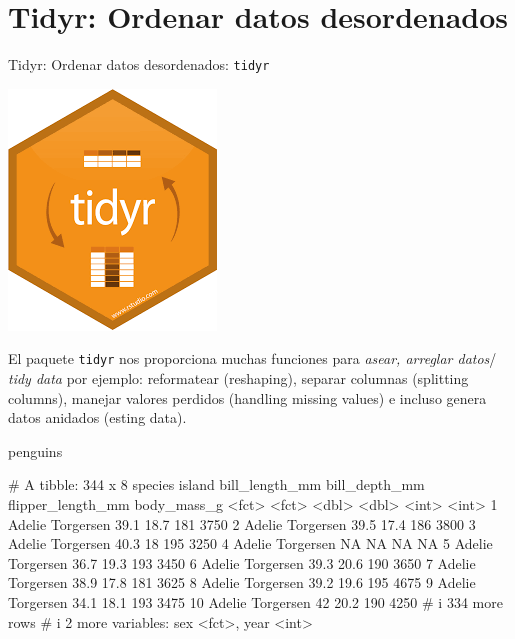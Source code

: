 \documentclass[
  ignorenonframetext,
  aspectratio=169]{beamer}
\newenvironment{Shaded}{\begin{snugshade}}{\end{snugshade}}
\newcommand{\NormalTok}[1]{#1}
\let\oldverbatim\verbatim
\let\endoldverbatim\endverbatim
\renewenvironment{verbatim}{\tiny\oldverbatim}{\endoldverbatim}
\begin{document}
\section{Tidyr: Ordenar datos
desordenados}\label{tidyr-ordenar-datos-desordenados}

\begin{frame}[fragile]{Tidyr: Ordenar datos desordenados:
\texttt{tidyr}}
\label{tidyr-ordenar-datos-desordenados-tidyr}
\begin{flushright}\includegraphics[width=0.05\linewidth]{Imgs/logo_tidyr} \end{flushright}

El paquete \texttt{tidyr} nos proporciona muchas funciones para
\emph{asear, arreglar datos}/ \emph{tidy data} por ejemplo: reformatear
(reshaping), separar columnas (splitting columns), manejar valores
perdidos (handling missing values) e incluso genera datos anidados
(esting data).

\begin{Shaded}
\begin{Highlighting}[]
\NormalTok{penguins}
\end{Highlighting}
\end{Shaded}

\begin{verbatim}
# A tibble: 344 x 8
   species island    bill_length_mm bill_depth_mm flipper_length_mm body_mass_g
   <fct>   <fct>              <dbl>         <dbl>             <int>       <int>
 1 Adelie  Torgersen           39.1          18.7               181        3750
 2 Adelie  Torgersen           39.5          17.4               186        3800
 3 Adelie  Torgersen           40.3          18                 195        3250
 4 Adelie  Torgersen           NA            NA                  NA          NA
 5 Adelie  Torgersen           36.7          19.3               193        3450
 6 Adelie  Torgersen           39.3          20.6               190        3650
 7 Adelie  Torgersen           38.9          17.8               181        3625
 8 Adelie  Torgersen           39.2          19.6               195        4675
 9 Adelie  Torgersen           34.1          18.1               193        3475
10 Adelie  Torgersen           42            20.2               190        4250
# i 334 more rows
# i 2 more variables: sex <fct>, year <int>
\end{verbatim}
\end{frame}
\end{document}
